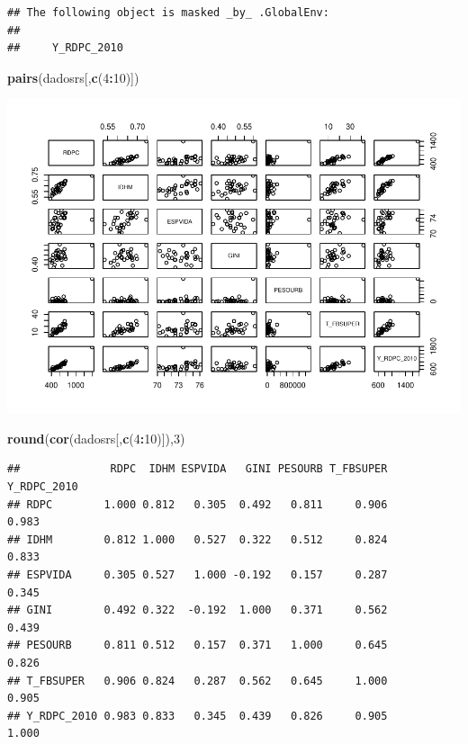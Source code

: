 \documentclass[]{article}
\newenvironment{Shaded}{\begin{snugshade}}{\end{snugshade}}
\newcommand{\KeywordTok}[1]{\textcolor[rgb]{0.13,0.29,0.53}{\textbf{#1}}}
\newcommand{\DecValTok}[1]{\textcolor[rgb]{0.00,0.00,0.81}{#1}}
\newcommand{\OperatorTok}[1]{\textcolor[rgb]{0.81,0.36,0.00}{\textbf{#1}}}
\newcommand{\NormalTok}[1]{#1}
\begin{document}
\begin{verbatim}
## The following object is masked _by_ .GlobalEnv:
## 
##     Y_RDPC_2010
\end{verbatim}

\begin{Shaded}
\begin{Highlighting}[]
\KeywordTok{pairs}\NormalTok{(dadosrs[,}\KeywordTok{c}\NormalTok{(}\DecValTok{4}\OperatorTok{:}\DecValTok{10}\NormalTok{)])}
\end{Highlighting}
\end{Shaded}

\includegraphics{AnaliseRegressaoRendaPerCaptaRS_files/figure-latex/multicolinearidade01-1.pdf}

\begin{Shaded}
\begin{Highlighting}[]
\KeywordTok{round}\NormalTok{(}\KeywordTok{cor}\NormalTok{(dadosrs[,}\KeywordTok{c}\NormalTok{(}\DecValTok{4}\OperatorTok{:}\DecValTok{10}\NormalTok{)]),}\DecValTok{3}\NormalTok{)}
\end{Highlighting}
\end{Shaded}

\begin{verbatim}
##              RDPC  IDHM ESPVIDA   GINI PESOURB T_FBSUPER Y_RDPC_2010
## RDPC        1.000 0.812   0.305  0.492   0.811     0.906       0.983
## IDHM        0.812 1.000   0.527  0.322   0.512     0.824       0.833
## ESPVIDA     0.305 0.527   1.000 -0.192   0.157     0.287       0.345
## GINI        0.492 0.322  -0.192  1.000   0.371     0.562       0.439
## PESOURB     0.811 0.512   0.157  0.371   1.000     0.645       0.826
## T_FBSUPER   0.906 0.824   0.287  0.562   0.645     1.000       0.905
## Y_RDPC_2010 0.983 0.833   0.345  0.439   0.826     0.905       1.000
\end{verbatim}
\end{document}
